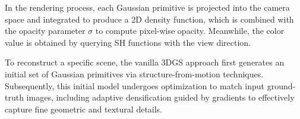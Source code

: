 \documentclass[lettersize,journal]{IEEEtran}
\begin{document}
In the rendering process, each Gaussian primitive is projected into the camera space and integrated to produce a 2D density function, which is combined with the opacity parameter $\sigma$ to compute pixel-wise opacity. Meanwhile, the color value is obtained by querying SH functions with the view direction.

To reconstruct a specific scene, the vanilla 3DGS approach first generates an initial set of Gaussian primitives via structure-from-motion techniques. Subsequently, this initial model undergoes optimization to match input ground-truth images, including adaptive densification guided by gradients to effectively capture fine geometric and textural details.
\end{document}
